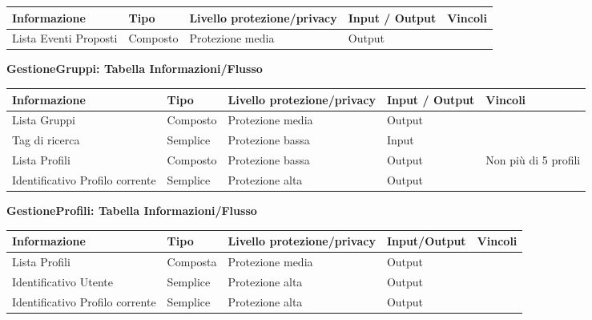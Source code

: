 \begin{tabular} {|P{3cm}|P{3cm}|P{3cm}|P{3cm}|P{3cm}|}
    \hline
    \textbf{Informazione} & \textbf{Tipo} & \textbf{Livello protezione/privacy} & \textbf{Input / Output} & \textbf{Vincoli} \\
    \hline
    Lista Eventi Proposti & Composto      & Protezione media                    & Output                  &                  \\
    \hline
\end{tabular}
\hfill \break

\textbf{GestioneGruppi: Tabella Informazioni/Flusso}
\hfill \break

\begin{tabular} {|P{3cm}|P{3cm}|P{3cm}|P{3cm}|P{3cm}|}
    \hline
    \textbf{Informazione}           & \textbf{Tipo} & \textbf{Livello protezione/privacy} & \textbf{Input / Output} & \textbf{Vincoli}     \\
    \hline
    Lista Gruppi                    & Composto      & Protezione media                    & Output                  &                      \\
    \hline
    Tag di ricerca                  & Semplice      & Protezione bassa                    & Input                   &                      \\
    \hline
    Lista Profili                   & Composto      & Protezione bassa                    & Output                  & Non più di 5 profili \\
    \hline
    Identificativo Profilo corrente & Semplice      & Protezione alta                     & Output                  &                      \\
    \hline
\end{tabular}
\hfill \break

\textbf{GestioneProfili: Tabella Informazioni/Flusso}
\hfill \break

\begin{tabular} {|P{3cm}|P{3cm}|P{3cm}|P{3cm}|P{3cm}|}
    \hline
    \textbf{Informazione}           & \textbf{Tipo} & \textbf{Livello protezione/privacy} & \textbf{Input/Output} & \textbf{Vincoli} \\
    \hline
    Lista Profili                   & Composta      & Protezione media                    & Output                &                  \\
    \hline
    Identificativo Utente           & Semplice      & Protezione alta                     & Output                &                  \\
    \hline
    Identificativo Profilo corrente & Semplice      & Protezione alta                     & Output                &                  \\
    \hline
\end{tabular}
\hfill \break

